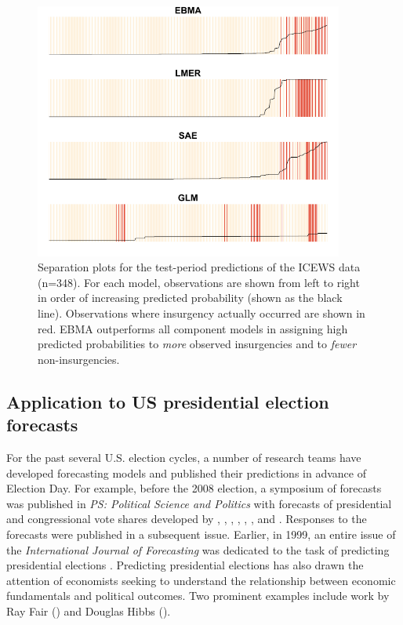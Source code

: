 \begin{figure}
 \caption{\footnotesize Separation plots for the test-period
    predictions of the ICEWS data (n=348).  For each model,
    observations are shown from left to right in order of increasing
    predicted probability (shown as the black line).  Observations
    where insurgency actually occurred are shown in red.  EBMA
    outperforms all component models in assigning high predicted
    probabilities to \textit{more} observed insurgencies and to
    \textit{fewer} non-insurgencies.}
\label{OutSam1sep}
\begin{center}
\includegraphics[width=4in]{OutSample2.pdf}
\end{center}
\end{figure}


\subsection{Application to US presidential election forecasts}
For the past several U.S. election cycles, a number of research teams
have developed forecasting models and published their predictions in
advance of Election Day.  For example, before the 2008 election, a
symposium of forecasts was published in \emph{PS: Political Science
  and Politics} with forecasts of presidential and congressional vote
shares developed by \citet{Campbell:2008}, \citet{Norpoth:2008},
\citet{Lewis-Beck:Tien:2008}, \citet{Abramowitz:2008},
\citet{Erikson:Wlezien:2008}, \citet{Holbrook:2008},
\citet{Lockerbie:2008} and \citet{Cuzan:Bundrick:2008}.  Responses to
the forecasts were published in a subsequent issue. Earlier, in 1999,
an entire issue of the \textit{International Journal of Forecasting}
was dedicated to the task of predicting presidential elections
\citep{Brown:1999}.  Predicting presidential elections has also drawn
the attention of economists seeking to understand the relationship
between economic fundamentals and political outcomes.  Two prominent
examples include work by Ray Fair (\citeyear{Fair:2010}) and Douglas
Hibbs (\citeyear{Hibbs:2000}).

